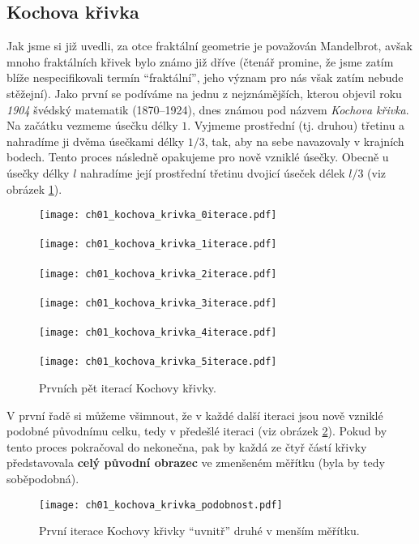 \subsection{Kochova křivka}\label{subsec:kochova_krivka}
Jak jsme si již uvedli, za otce fraktální geometrie je považován Mandelbrot, avšak mnoho fraktálních křivek bylo známo již dříve (čtenář promine, že jsme zatím blíže nespecifikovali termín ``fraktální'', jeho význam pro nás však zatím nebude stěžejní). Jako první se podíváme na jednu z nejznámějších, kterou objevil roku \emph{1904} švédský matematik  \mbox{(1870--1924)}, dnes známou pod názvem \emph{Kochova křivka}. \citep[str. 61]{Peitgen2004} Na začátku vezmeme úsečku délky $1$. Vyjmeme prostřední (tj. druhou) třetinu a nahradíme ji dvěma úsečkami délky $1/3$, tak, aby na sebe navazovaly v krajních bodech. Tento proces následně opakujeme pro nově vzniklé úsečky. Obecně u úsečky délky $l$ nahradíme její prostřední třetinu dvojicí úseček délek $l/3$ (viz obrázek \ref{fig:kochova_vlocka_5iteraci}).
\begin{figure}[h]
    \centering
    \texttt{[image: ch01\_kochova\_krivka\_0iterace.pdf]}\\\qquad\\
    \texttt{[image: ch01\_kochova\_krivka\_1iterace.pdf]}\\\qquad\\
    \texttt{[image: ch01\_kochova\_krivka\_2iterace.pdf]}\\\qquad\\
    \texttt{[image: ch01\_kochova\_krivka\_3iterace.pdf]}\\\qquad\\
    \texttt{[image: ch01\_kochova\_krivka\_4iterace.pdf]}\\\qquad\\
    \texttt{[image: ch01\_kochova\_krivka\_5iterace.pdf]}
    \caption{Prvních pět iterací Kochovy křivky.}
    \label{fig:kochova_vlocka_5iteraci}
\end{figure}
V první řadě si můžeme všimnout, že v každé další iteraci jsou nově vzniklé podobné původnímu celku, tedy v předešlé iteraci (viz obrázek \ref{fig:kochova_krivka_podobnost}). Pokud by tento proces pokračoval do nekonečna, pak by každá ze čtyř částí křivky představovala \textbf{celý původní obrazec} ve zmenšeném měřítku (byla by tedy soběpodobná).
\begin{figure}[h]
    \centering
    \texttt{[image: ch01\_kochova\_krivka\_podobnost.pdf]}
    \caption{První iterace Kochovy křivky ``uvnitř'' druhé v menším měřítku.}
    \label{fig:kochova_krivka_podobnost}
\end{figure}
